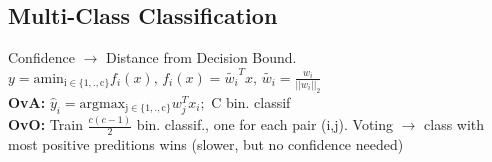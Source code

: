 

\subsection*{Multi-Class Classification}
Confidence $\rightarrow$ Distance from Decision Bound.\\
$y=\operatorname{amin_{i \in \{1,.,c\}}}f_i(x),\, f_i(x)=\widetilde{w_i}^Tx,\, \widetilde{w_i}=\frac{w_i}{||w_i||_2}$\\
\textbf{OvA: }$\hat{y}_i=\operatorname{argmax_{j \in \{1,.,c\}}}w_j^Tx_i;$
C bin. classif\\
\textbf{OvO: }Train $\frac{c(c-1)}{2}$ bin. classif., one for each pair (i,j). Voting $\rightarrow$ class with most positive preditions wins (slower, but no confidence needed)

